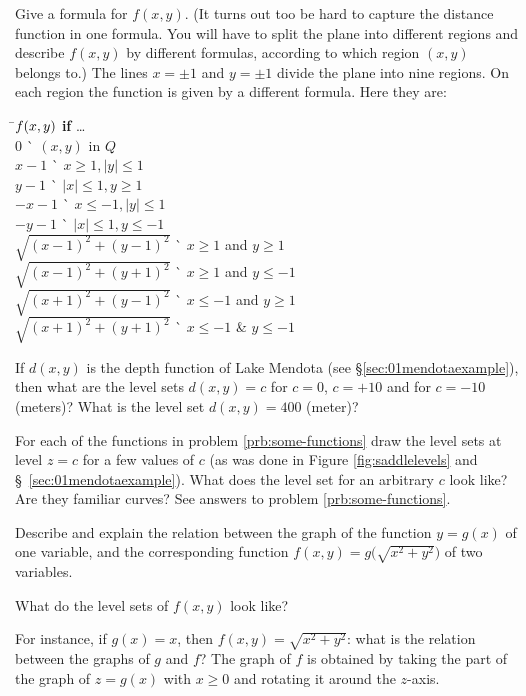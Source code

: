 \subprob Give a formula for $f(x, y)$.  (It turns out too be hard to
capture the distance function in one formula.  You will have to split the
plane into different regions and describe $f(x,y)$ by different formulas,
according to which region $(x,y)$ belongs to.)
\answer
The lines $x=\pm1$ and $y=\pm1$ divide the plane into nine regions.
On each region the function is given by a different formula.
Here they are:
\begin{tabbing}
\=$\boldmath{f(x, y)}$ \=\`\textbf{ if } \ldots \\
\>$0$  \>\` $(x, y)$ in $Q$\\
\>$x-1$ \>\` $x\geq1, |y|\leq 1$\\
\>$y-1$ \>\` $|x|\leq 1, y\geq1$\\
\>$-x-1$ \>\` $x\le-1, |y|\leq 1$\\
\>$-y-1$ \>\` $|x|\leq 1, y\le-1$\\
\>$\sqrt{(x-1)^2+(y-1)^2}$ \>\` $x\ge1$ and $y\ge1$\\
\>$\sqrt{(x-1)^2+(y+1)^2}$ \>\` $x\ge1$ and $y\le-1$\\
\>$\sqrt{(x+1)^2+(y-1)^2}$ \>\` $x\le-1$ and $y\ge1$\\
\>$\sqrt{(x+1)^2+(y+1)^2}$ \>\` $x\le-1$ \& $y\le-1$\\
\end{tabbing}
\endanswer


\problem If $d(x, y)$ is the depth function of Lake Mendota (see
\S\ref{sec:01mendotaexample}), then what are the level sets $d(x, y) =
c$ for $c=0$, $c=+10$ and for $c=-10$ (meters)?  What is the level
set $d(x, y) = 400$ (meter)?

\problem For each of the functions in problem \ref{prb:some-functions}
draw the level sets at level $z=c$ for a few values of $c$ (as was
done in Figure \ref{fig:saddlelevels} and
\S~\ref{sec:01mendotaexample}).  What does the level set for an
arbitrary $c$ look like?  Are they familiar curves?
\answer
See answers to problem \ref{prb:some-functions}.
\endanswer

\problem Describe and explain the relation between the graph of the
function $y=g(x)$ of one variable, and the corresponding function
$f(x, y) = g\bigl( \sqrt{x^2+y^2} \bigr)$ of two variables.

What do the level sets of $f(x, y)$ look like?

For instance, if $g(x) = x$, then $f(x, y) = \sqrt{x^2+y^2}$: what is
the relation between the graphs of $g$ and $f$?
\answer
The graph of $f$ is obtained by taking the part of the graph of $z=g(x)$
with $x\ge0$ and rotating it around the $z$-axis.

